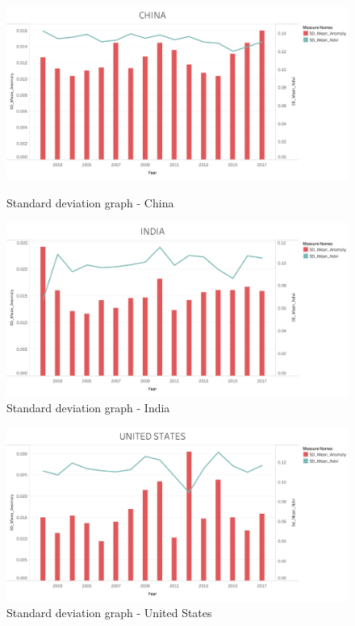 \begin{itemize}
     \begin{figure}[!htb]
        \begin{minipage}{0.5\textwidth}
            \centering
            \includegraphics[width=1.0\linewidth]{figures/ch5/StandardDeviation/CHINA_SD.png}
            \caption{Standard deviation graph - China}\label{Fig:CHINA_SD}
        \end{minipage}\hfill
        \begin{minipage}{0.5\textwidth}
            \centering
            \includegraphics[width=1.0\linewidth]{figures/ch5/StandardDeviation/INDIA_SD.png}
            \caption{Standard deviation graph - India}\label{Fig:INDIA_SD}
        \end{minipage}
    \end{figure}
    
     \begin{figure}[H]
            \centering
            \includegraphics[width=0.5\linewidth]{figures/ch5/StandardDeviation/US_SD.png}
            \caption{\label{fig:US_SD}Standard deviation graph - United States}
    \end{figure}
    

\end{itemize}

